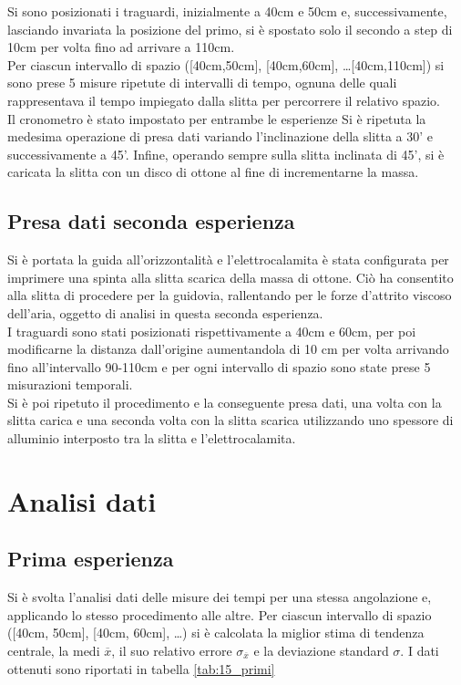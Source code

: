\documentclass[a4paper,11pt,oneside]{article}
\begin{document}
Si sono posizionati i traguardi, inizialmente a 40cm e 50cm e, successivamente, lasciando invariata la posizione del primo, si è spostato solo il secondo a step di 10cm per volta fino ad arrivare a 110cm. \\
Per ciascun intervallo di spazio ([40cm,50cm], [40cm,60cm], \dots [40cm,110cm]) si sono prese 5 misure ripetute di intervalli di tempo, ognuna delle quali rappresentava il tempo impiegato dalla slitta per percorrere il relativo spazio.\\  %
Il cronometro è stato impostato per entrambe le esperienze
Si è ripetuta la medesima operazione di presa dati variando l'inclinazione della slitta a 30' e successivamente a 45'.
Infine, operando sempre sulla slitta inclinata di 45', si è caricata la slitta con un disco di ottone al fine di incrementarne la massa.

\subsection{Presa dati seconda esperienza}
Si è portata la guida all'orizzontalità e l'elettrocalamita è stata configurata per imprimere una spinta alla slitta scarica della massa di ottone. Ciò ha consentito alla slitta di procedere per la guidovia, rallentando per le forze d'attrito viscoso dell'aria, oggetto di analisi in questa seconda esperienza.\\
I traguardi sono stati posizionati rispettivamente a 40cm e 60cm, per poi modificarne la distanza dall'origine aumentandola di 10 cm per volta arrivando fino all'intervallo 90-110cm e per ogni intervallo di spazio sono state prese 5 misurazioni temporali.\\
Si è poi ripetuto il procedimento e la conseguente presa dati, una volta con la slitta carica e una seconda volta con la slitta scarica utilizzando uno spessore di alluminio interposto tra la slitta e l'elettrocalamita.

\section{Analisi dati}
\subsection{Prima esperienza}
Si è svolta l'analisi dati delle misure dei tempi per una stessa angolazione e, applicando lo stesso procedimento alle altre.
Per ciascun intervallo di spazio ([40cm, 50cm], [40cm, 60cm], \dots) si è calcolata la miglior stima di tendenza centrale, la medi $\overline{x}$, il suo relativo errore $\sigma_{\overline{x}}$ e la deviazione standard $\sigma$.
I dati ottenuti sono riportati in tabella \ref{tab:15_primi}
\end{document}
